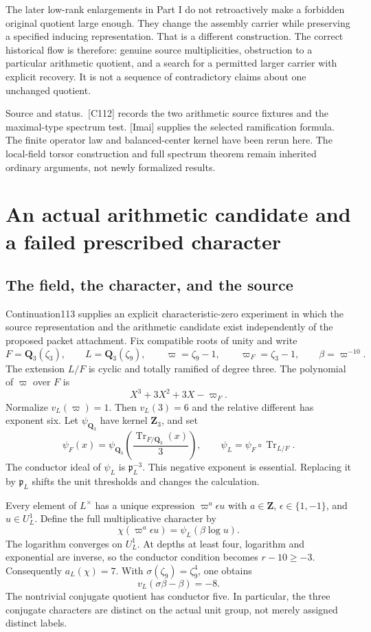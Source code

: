 \documentclass[11pt]{article}
\theoremstyle{definition}\newtheorem{definition}[proposition]{Definition}
\newcommand{\Tr}{\operatorname{Tr}}
\newcommand{\Q}{\mathbf Q}
\newcommand{\Z}{\mathbf Z}
\newcommand{\pp}{\mathfrak p}
\newcommand{\source}[1]{\par{\small\textsf{Source and status.}\ #1}\par}
\begin{document}
The later low-rank enlargements in Part I do not retroactively make a forbidden original quotient large enough. They change the assembly carrier while preserving a specified inducing representation. That is a different construction. The correct historical flow is therefore: genuine source multiplicities, obstruction to a particular arithmetic quotient, and a search for a permitted larger carrier with explicit recovery. It is not a sequence of contradictory claims about one unchanged quotient.

\source{[C112] records the two arithmetic source fixtures and the maximal-type spectrum test. [Imai] supplies the selected ramification formula. The finite operator law and balanced-center kernel have been rerun here. The local-field torsor construction and full spectrum theorem remain inherited ordinary arguments, not newly formalized results.}

\section{An actual arithmetic candidate and a failed prescribed character}\label{sec:arithmetic}
\subsection{The field, the character, and the source}
Continuation113 supplies an explicit characteristic-zero experiment in which the source representation and the arithmetic candidate exist independently of the proposed packet attachment. Fix compatible roots of unity and write
\[
 F=\Q_3(\zeta_3),\qquad L=\Q_3(\zeta_9),\qquad
 \varpi=\zeta_9-1,\qquad \varpi_F=\zeta_3-1,
 \qquad \beta=\varpi^{-10}.
 \tag{17.1}\label{eq:fields}
\]
The extension $L/F$ is cyclic and totally ramified of degree three. The polynomial of $\varpi$ over $F$ is
\[
 X^3+3X^2+3X-\varpi_F.
\]
Normalize $v_L(\varpi)=1$. Then $v_L(3)=6$ and the relative different has exponent six. Let $\psi_{\Q_3}$ have kernel $\Z_3$, and set
\[
 \psi_F(x)=\psi_{\Q_3}\!\left(\frac{\Tr_{F/\Q_3}(x)}{3}\right),
 \qquad \psi_L=\psi_F\circ\Tr_{L/F}.
\]
The conductor ideal of $\psi_L$ is $\pp_L^{-3}$. This negative exponent is essential. Replacing it by $\pp_L$ shifts the unit thresholds and changes the calculation.

Every element of $L^\times$ has a unique expression $\varpi^a\epsilon u$ with $a\in\Z$, $\epsilon\in\{1,-1\}$, and $u\in U_L^1$. Define the full multiplicative character by
\[
 \chi(\varpi^a\epsilon u)=\psi_L(\beta\log u).
 \tag{17.2}\label{eq:chi}
\]
The logarithm converges on $U_L^1$. At depths at least four, logarithm and exponential are inverse, so the conductor condition becomes $r-10\geq-3$. Consequently $a_L(\chi)=7$. With $\sigma(\zeta_9)=\zeta_9^4$, one obtains
\[
 v_L(\sigma\beta-\beta)=-8.
\]
The nontrivial conjugate quotient has conductor five. In particular, the three conjugate characters are distinct on the actual unit group, not merely assigned distinct labels.
\end{document}
